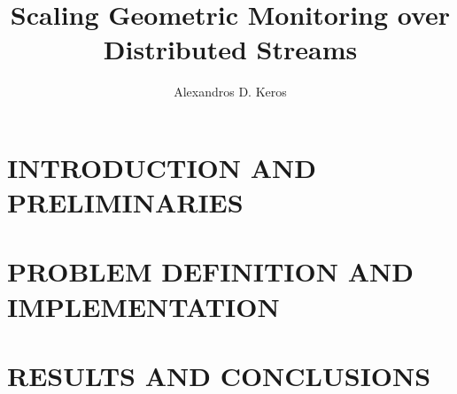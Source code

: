 \documentclass[ee, msthesis]{usuthesis}
\author{Alexandros D. Keros}
\title{Scaling Geometric Monitoring over Distributed Streams}
\begin{document}
    \preliminaries   %

    \maketitle
    \makecopyright        %

    
    

    \tableofcontents
    \listoftables
    \listoffigures

    \body  %

	\part{INTRODUCTION AND PRELIMINARIES} \label{pt:introPrelim}    
    
    
    
    \part{PROBLEM DEFINITION AND IMPLEMENTATION} \label{pt:probDefImpl}
    
    
    \part{RESULTS AND CONCLUSIONS} \label{pt:resConc}
    
    
    
	
	\makeappendix
	    
\end{document}
